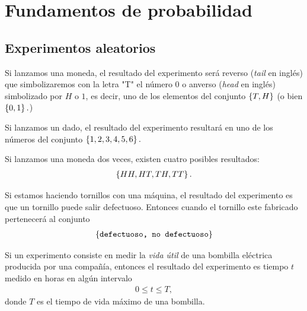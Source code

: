 
\section{Fundamentos de probabilidad}

\subsection{Experimentos aleatorios}

\begin{ejemplo}
	\label{exmp:1.1}
	Si lanzamos una moneda, el resultado del experimento será reverso (\emph{tail} en inglés) que simbolizaremos con la letra "T" el número $0$ o anverso (\emph{head} en inglés) simbolizado por $H$ o $1$, es decir, uno de los elementos del conjunto $\left\{ T,H \right\}$ (o bien $\left\{ 0,1 \right\}.$)
\end{ejemplo}



\begin{ejemplo}
	\label{exmp:1.2}
	Si lanzamos un dado, el resultado del experimento resultará en uno de los números del conjunto $\left\{ 1,2,3,4,5,6 \right\}.$
\end{ejemplo}



\begin{ejemplo}
	\label{exmp:1.3}
	Si lanzamos una moneda dos veces, existen cuatro posibles resultados:
	\begin{align}
		\left\{ HH,HT,TH,TT \right\}.
	\end{align}
	
\end{ejemplo}



\begin{ejemplo}
	\label{exmp:1.4}
	Si estamos haciendo tornillos con una máquina, el resultado del experimento es que un tornillo puede salir defectuoso. Entonces cuando el tornillo este fabricado pertenecerá al conjunto
	\begin{align}
		\left\{ \texttt{defectuoso, no defectuoso} \right\}
	\end{align}
	
\end{ejemplo}



\begin{ejemplo}
	\label{exmp:1.5}
	Si un experimento consiste en medir la \emph{vida útil} de una bombilla eléctrica producida por una compañía, entonces el resultado del experimento es tiempo $t$ medido en horas en algún intervalo
	\begin{align}
		0\leq t \leq T,
	\end{align}
	donde $T$ es el tiempo de vida máximo de una bombilla.
\end{ejemplo}



